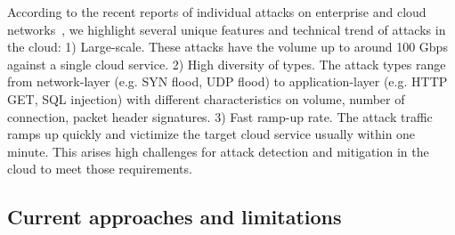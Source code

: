 According to the recent reports of individual attacks on enterprise and cloud
 networks~\cite{googlesecurityreport,Prolexic}, we highlight several unique features and technical trend
 of attacks in the cloud:
 1) Large-scale. These attacks have 
 the volume up to around 100 Gbps against a single cloud service. 
 2) High diversity of types. The attack types range from network-layer (e.g. SYN flood, UDP flood) to
 application-layer (e.g. HTTP GET, SQL injection) with different characteristics on volume, number of connection, packet header signatures. 
 3) Fast ramp-up rate. The attack traffic ramps up quickly and victimize the target cloud service usually within one minute.
This arises high challenges for attack detection and mitigation in the cloud to meet those requirements.

\subsection{Current approaches and limitations}











